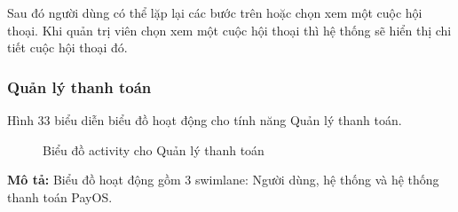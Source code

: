Sau đó người dùng có thể lặp lại các bước trên hoặc chọn xem một cuộc hội thoại. Khi quản trị viên chọn xem một cuộc hội thoại thì hệ thống sẽ hiển thị chi tiết cuộc hội thoại đó.

%      




\subsubsection{Quản lý thanh toán}
Hình 33 biểu diễn biểu đồ hoạt động cho tính năng Quản lý thanh toán.
\begin{figure}[H]
    \centering
     
    \vspace{0.5cm}
    \caption{Biểu đồ activity cho Quản lý thanh toán}
    \label{fig:enter-label}
\end{figure}

\textbf{Mô tả:}
Biểu đồ hoạt động gồm 3 swimlane: Người dùng, hệ thống và hệ thống thanh toán PayOS.

